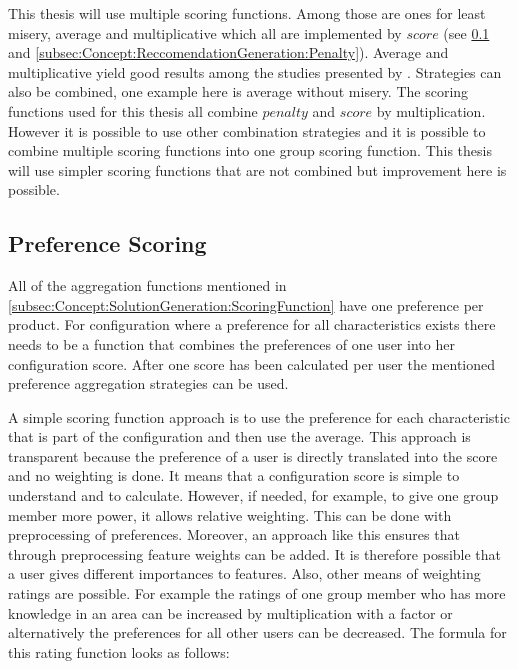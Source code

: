 This thesis will use multiple scoring functions. Among those are ones for least misery, average and multiplicative which all are implemented by $score$ (see \ref{subsec:Concept:ReccomendationGeneration:PreferenceScoring} and \ref{subsec:Concept:ReccomendationGeneration:Penalty}). Average and multiplicative yield good results among the studies presented by \citeauthor{Masthoff2015} \cite{Masthoff2015}. Strategies can also be combined, one example here is average without misery. The scoring functions used for this thesis all combine $penalty$ and $score$ by multiplication. However it is possible to use other combination strategies and it is possible to combine multiple scoring functions into one group scoring function. This thesis will use simpler scoring functions that are not combined but improvement here is possible.

\subsection{Preference Scoring}
\label{subsec:Concept:ReccomendationGeneration:PreferenceScoring}

All of the aggregation functions mentioned in \autoref{subsec:Concept:SolutionGeneration:ScoringFunction} have one preference per product. For configuration where a preference for all characteristics exists there needs to be a function that combines the preferences of one user into her configuration score. After one score has been calculated per user the mentioned preference aggregation strategies can be used.

A simple scoring function approach is to use the preference for each characteristic that is part of the configuration and then use the average. This approach is transparent because the preference of a user is directly translated into the score and no weighting is done. It means that a configuration score is simple to understand and to calculate. However, if needed, for example, to give one group member more power, it allows relative weighting. This can be done with preprocessing of preferences. Moreover, an approach like this ensures that through preprocessing feature weights can be added. It is therefore possible that a user gives different importances to features. Also, other means of weighting ratings are possible. For example the ratings of one group member who has more knowledge in an area can be increased by multiplication with a factor or alternatively the preferences for all other users can be decreased.
The formula for this rating function looks as follows:


